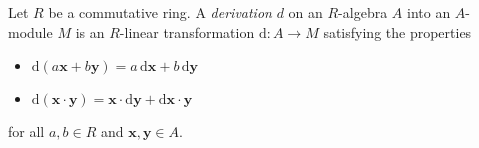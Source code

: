 \documentclass{article}
\newcommand{\x}{\mathbf{x}}
\newcommand{\y}{\mathbf{y}}
\renewcommand{\d}{\mathrm{d}}
\begin{document}
Let $R$ be a commutative ring. A \emph{derivation} $d$ on an $R$-algebra $A$ into an $A$-module $M$ is an $R$-linear transformation $\d\colon A \to M$ satisfying the properties
\begin{itemize}
\item $\d(a\x+b\y) = a\,\d\x + b\,\d\y$
\item $\d(\x\cdot \y) = \x \cdot \d\y + \d\x \cdot \y$
\end{itemize}
for all $a,b \in R$ and $\x,\y \in A$.
\end{document}
